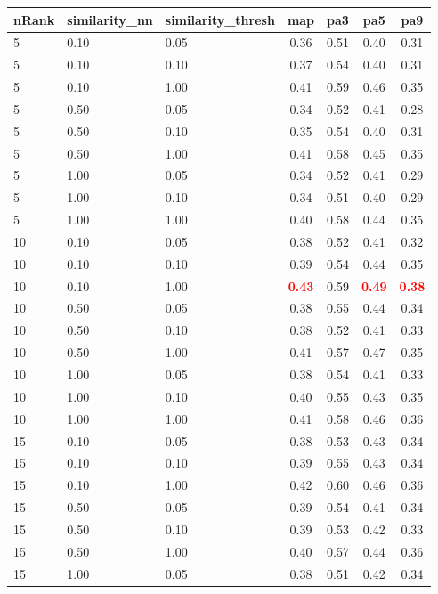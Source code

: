   
\begin{table} 
\begin{center} 
\scriptsize 
 \setlength{\tabcolsep}{.16667em} 
\begin{tabular}{lllcccc} 
nRank & similarity\_nn & similarity\_thresh & map & pa3 & pa5 & pa9 \\ 
\hline 
 5 & 0.10 & 0.05 & 0.36 & 0.51 & 0.40 & 0.31 \\ 
 5 & 0.10 & 0.10 & 0.37 & 0.54 & 0.40 & 0.31 \\ 
 5 & 0.10 & 1.00 & 0.41 & 0.59 & 0.46 & 0.35 \\ 
 5 & 0.50 & 0.05 & 0.34 & 0.52 & 0.41 & 0.28 \\ 
 5 & 0.50 & 0.10 & 0.35 & 0.54 & 0.40 & 0.31 \\ 
 5 & 0.50 & 1.00 & 0.41 & 0.58 & 0.45 & 0.35 \\ 
 5 & 1.00 & 0.05 & 0.34 & 0.52 & 0.41 & 0.29 \\ 
 5 & 1.00 & 0.10 & 0.34 & 0.51 & 0.40 & 0.29 \\ 
 5 & 1.00 & 1.00 & 0.40 & 0.58 & 0.44 & 0.35 \\ 
10 & 0.10 & 0.05 & 0.38 & 0.52 & 0.41 & 0.32 \\ 
10 & 0.10 & 0.10 & 0.39 & 0.54 & 0.44 & 0.35 \\ 
10 & 0.10 & 1.00 & \textbf{\textcolor{red}{0.43}} & 0.59 & \textbf{\textcolor{red}{0.49}} & \textbf{\textcolor{red}{0.38}} \\ 
10 & 0.50 & 0.05 & 0.38 & 0.55 & 0.44 & 0.34 \\ 
10 & 0.50 & 0.10 & 0.38 & 0.52 & 0.41 & 0.33 \\ 
10 & 0.50 & 1.00 & 0.41 & 0.57 & 0.47 & 0.35 \\ 
10 & 1.00 & 0.05 & 0.38 & 0.54 & 0.41 & 0.33 \\ 
10 & 1.00 & 0.10 & 0.40 & 0.55 & 0.43 & 0.35 \\ 
10 & 1.00 & 1.00 & 0.41 & 0.58 & 0.46 & 0.36 \\ 
15 & 0.10 & 0.05 & 0.38 & 0.53 & 0.43 & 0.34 \\ 
15 & 0.10 & 0.10 & 0.39 & 0.55 & 0.43 & 0.34 \\ 
15 & 0.10 & 1.00 & 0.42 & 0.60 & 0.46 & 0.36 \\ 
15 & 0.50 & 0.05 & 0.39 & 0.54 & 0.41 & 0.34 \\ 
15 & 0.50 & 0.10 & 0.39 & 0.53 & 0.42 & 0.33 \\ 
15 & 0.50 & 1.00 & 0.40 & 0.57 & 0.44 & 0.36 \\ 
15 & 1.00 & 0.05 & 0.38 & 0.51 & 0.42 & 0.34 \\ 

\end{tabular}
\end{center}
\end{table}

